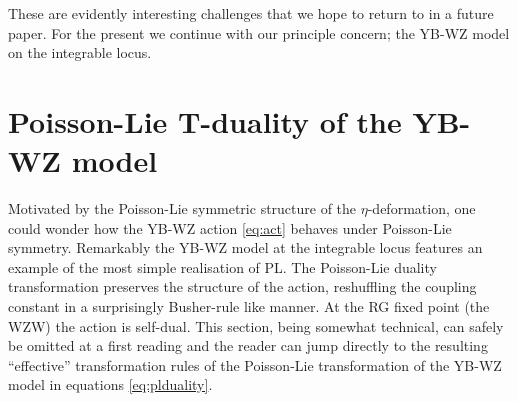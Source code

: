 \documentclass[12pt]{article}
\def\ee{\boldsymbol{e}}
\def\be{\begin{equation}}
\def\ee{\end{equation}}
\begin{document}
These are evidently interesting challenges that we hope to return to in a future paper.  For the present we continue with our principle concern; the YB-WZ model on the integrable locus.
 


  
 \section{Poisson-Lie T-duality of the YB-WZ model} \label{s4}

Motivated by the Poisson-Lie  symmetric structure of the $\eta$-deformation, one could wonder how the YB-WZ action \eqref{eq:act} behaves under Poisson-Lie symmetry. Remarkably the YB-WZ model at the integrable locus features an example of the most simple realisation of PL. The Poisson-Lie duality transformation preserves the structure of the action, reshuffling the coupling constant in a surprisingly Busher-rule like manner. At the RG fixed point (the WZW) the action is self-dual. This section, being somewhat technical, can safely be omitted at a first reading and the reader can jump directly to the resulting ``effective'' transformation rules of the Poisson-Lie transformation of the YB-WZ model in equations \eqref{eq:plduality}.
 
\end{document}
